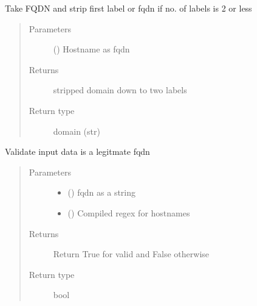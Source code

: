 \documentclass[letterpaper,10pt,english]{sphinxmanual}
\begin{document}

\begin{fulllineitems}
\label{\detokenize{utils:bloxone.utils.strip_host}}
\sphinxAtStartPar
Take FQDN and strip first label
or fqdn if no. of labels is 2 or less
\begin{quote}\begin{description}
\item[{Parameters}] \leavevmode
\sphinxAtStartPar
{} () \textendash{} Hostname as fqdn

\item[{Returns}] \leavevmode
\sphinxAtStartPar
stripped domain down to two labels

\item[{Return type}] \leavevmode
\sphinxAtStartPar
domain (str)

\end{description}\end{quote}

\end{fulllineitems}


\begin{fulllineitems}
\label{\detokenize{utils:bloxone.utils.validate_fqdn}}
\sphinxAtStartPar
Validate input data is a legitmate fqdn
\begin{quote}\begin{description}
\item[{Parameters}] \leavevmode\begin{itemize}
\item {} 
\sphinxAtStartPar
{} () \textendash{} fqdn as a string

\item {} 
\sphinxAtStartPar
{} () \textendash{} Compiled regex for hostnames

\end{itemize}

\item[{Returns}] \leavevmode
\sphinxAtStartPar
Return True for valid and False otherwise

\item[{Return type}] \leavevmode
\sphinxAtStartPar
bool

\end{description}\end{quote}

\end{fulllineitems}
\end{document}
